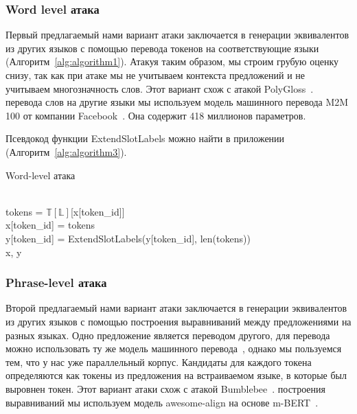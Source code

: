 \subsubsection{Word level атака}
Первый предлагаемый нами вариант атаки заключается в генерации эквивалентов из других языков с помощью перевода токенов на соответствующие языки (Алгоритм~\eqref{alg:algorithm1}).
Атакуя таким образом, мы строим грубую оценку снизу, так как при атаке мы не учитываем контекста предложений и не учитываем многозначность слов.
Этот вариант схож с атакой PolyGloss~\cite{Tan2021CodeMixingOS}.
 перевода слов на другие языки мы используем модель машинного перевода M2M 100 от компании Facebook~\cite{Fan2020BeyondEM}.
Она содержит 418 миллионов параметров.
\par Псевдокод функции ExtendSlotLabels можно найти в приложении (Алгоритм~\eqref{alg:algorithm3}).

\begin{algorithm}
    \caption{Word-level атака}
    \begin{algorithmic}
            \ind{}
                    \\
                    \ind\ind tokens = $\mathbb{T}[\mathbb{L}]$[x[token\_id]]\\
                    \ind\ind x[token\_id] = tokens\\
                    \ind\ind y[token\_id] = ExtendSlotLabels(y[token\_id], len(tokens))
            \EndIf \\
            \ind\Return x, y
        \EndFunction
    \end{algorithmic}\label{alg:algorithm1}
\end{algorithm}



\subsubsection{Phrase-level атака}
Второй предлагаемый нами вариант атаки заключается в генерации эквивалентов из других языков с помощью построения выравниваний между предложениями на разных языках.
Одно предложение является переводом другого, для перевода можно использовать ту же модель машинного перевода~\cite{Fan2020BeyondEM}, однако мы пользуемся тем, что у нас уже параллельный корпус.
Кандидаты для каждого токена определяются как токены из предложения на встраиваемом языке, в которые был выровнен токен.
Этот вариант атаки схож с атакой Bumblebee~\cite{Tan2021CodeMixingOS}.
 построения выравниваний мы используем модель awesome-align на основе m-BERT~\cite{Dou2021WordAB}.


